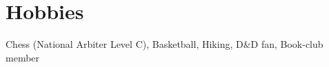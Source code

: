 \section{Hobbies}
  \resumeSubHeadingListStart
    \small{\item{Chess (National Arbiter Level C), Basketball, Hiking, D\&D fan, Book-club member}}
  \resumeSubHeadingListEnd


